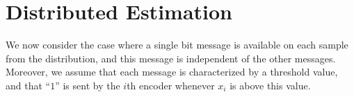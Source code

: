 \documentclass[letterpaper, conference]{IEEEtran}      %
\newcommand{\sgn}{\mathrm{sgn} }
\begin{document}
\begin{comment}
\subsection{Relation to Sigma-Delta Modulation \label{subsec:sdm}}
The SDM is a device that converts continuous-time analog signals to a discrete-time sequence of binary digits. The basic operation of a SDM can be described as follows: the modulator takes as input a sequence of continuous amplitude samples $X_n$, which are typically represents samples of a continuous-time signal taken uniformly at sampling rate $f_s$ much higher than the Nyquist rate of the signal \cite{1095151}. The output of the modulator is a sequence $M_n$ of binary values, obtained according to the following rule: 
\begin{align}
\begin{cases} V_{n+1} & =  V_n - \alpha q(V_n) + X_n, \\
M_n & = \sgn(V_n)  \end{cases}, \quad n=1,2,\ldots, \label{eq:sdm}
\end{align}
where $\alpha > 0$ is a parameter of the modulator that is determined by the maximal value of the input sequence $X^n$. The SDM of the form \eqref{eq:sdm} was studied in \cite{53738} under the assumption that the input process $X_n$ is an i.i.d Gaussian process. The main results from \cite{53738} shows that regardless of the initial state $V_0$, the process $M_n$ is a stationary ergodic process with mean $\theta$. It follows that a consistent estimation of $\theta$ is obtained by taking the mean of the sequence $\{M_n\}$. However, the results from \cite{53738} does not provide a closed form for the second order statistics of $\{M_n\}$, so that convergence rate cannot be derived from \cite{53738}.  
\end{comment}


\section{Distributed Estimation \label{sec:distributed}}
We now consider the case where a single bit message is available on each sample from the distribution, and this message is independent of the other messages. Moreover, we assume that each message is characterized by a threshold value, and that ``$1$'' is sent by the $i$th encoder whenever $x_i$ is above this value. 
\end{document}
